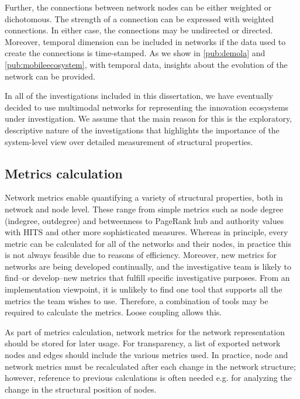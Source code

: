 Further, the connections between network nodes can be either weighted or dichotomous. The strength of a connection can be expressed with weighted connections. In either case, the connections may be undirected or directed. Moreover, temporal dimension can be included in networks if the data used to create the connections is time-stamped. As we show in \ref{pub:demola} and \ref{pub:mobileecosystem}, with temporal data, insights about the evolution of the network can be provided.

In all of the investigations included in this dissertation, we have eventually decided to use multimodal networks for representing the innovation ecosystems under investigation. We assume that the main reason for this is the exploratory, descriptive nature of the investigations that highlights the importance of the system-level view over detailed measurement of structural properties. 

\subsection{Metrics calculation}

Network metrics enable quantifying a variety of structural properties, both in network and node level. These range from simple metrics such as node degree (indegree, outdegree) \citep{Freeman1978CentralityClarification} and betweenness to PageRank \citep{Page1999TheWeb} hub and authority values with HITS \citep{Kleinberg1999AuthoritativeEnvironment} and other more sophisticated measures. Whereas in principle, every metric can be calculated for all of the networks and their nodes, in practice this is not always feasible due to reasons of efficiency. Moreover, new metrics for networks are being developed continually, and the investigative team is likely to find--or develop--new metrics that fulfill specific investigative purposes. From an implementation viewpoint, it is unlikely to find one tool that supports all the metrics the team wishes to use. Therefore, a combination of tools may be required to calculate the metrics. Loose coupling allows this.

As part of metrics calculation, network metrics for the network representation should be stored for later usage. For transparency, a list of exported network nodes and edges should include the various metrics used. In practice, node and network metrics must be recalculated after each change in the network structure; however, reference to previous calculations is often needed e.g. for analyzing the change in the structural position of nodes.

